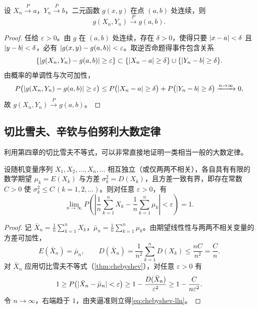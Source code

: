 \begin{proposition}[依概率收敛的连续映射性质]
\label{prop:conv-prob-continuous}
设 $X_n\xrightarrow{P} a$，$Y_n\xrightarrow{P} b$，二元函数 $g(x,y)$ 在点 $(a,b)$ 处连续，则
\[
  g(X_n,Y_n)\xrightarrow{P} g(a,b).
\]
\end{proposition}
\begin{proof}
任给 $\varepsilon>0$。由 $g$ 在 $(a,b)$ 处连续，存在 $\delta>0$，使得只要 $\lvert x-a\rvert<\delta$ 且 $\lvert y-b\rvert<\delta$，必有 $\lvert g(x,y)-g(a,b)\rvert<\varepsilon$。取逆否命题得事件包含关系
\[
  \{\lvert g(X_n,Y_n)-g(a,b)\rvert\ge\varepsilon\}
  \subset\{\lvert X_n-a\rvert\ge\delta\}\cup\{\lvert Y_n-b\rvert\ge\delta\}.
\]
由概率的单调性与次可加性，
\[
  P\bigl(\lvert g(X_n,Y_n)-g(a,b)\rvert\ge\varepsilon\bigr)
  \le P\bigl(\lvert X_n-a\rvert\ge\delta\bigr)+P\bigl(\lvert Y_n-b\rvert\ge\delta\bigr)
  \xrightarrow{n\to\infty} 0,
\]
故 $g(X_n,Y_n)\xrightarrow{P} g(a,b)$。
\end{proof}

\subsection{切比雪夫、辛钦与伯努利大数定律}

利用第四章的切比雪夫不等式，可以非常直接地证明一类相当一般的大数定律。

\begin{theorem}[切比雪夫大数定律]
\label{thm:chebyshev-lln}
设随机变量序列 $X_1,X_2,\ldots,X_n,\ldots$ 相互独立（或仅两两不相关），各自具有有限的数学期望 $\mu_k=E(X_k)$ 与方差 $\sigma_k^2=D(X_k)$，且方差一致有界，即存在常数 $C>0$ 使 $\sigma_k^2\le C\,(k=1,2,\ldots)$。则对任意 $\varepsilon>0$，有
\begin{equation}
  \lim_{n\to\infty}P\!\left(\left|\frac{1}{n}\sum_{k=1}^{n}X_k-\frac{1}{n}\sum_{k=1}^{n}\mu_k\right|<\varepsilon\right)=1.
  \label{eq:chebyshev-lln}
\end{equation}
\end{theorem}
\begin{proof}
记 $\bar{X}_n=\frac{1}{n}\sum_{k=1}^{n}X_k$，$\bar{\mu}_n=\frac{1}{n}\sum_{k=1}^{n}\mu_k$。由期望线性性与两两不相关变量的方差可加性，
\[
  E(\bar{X}_n)=\bar{\mu}_n,\qquad
  D(\bar{X}_n)=\frac{1}{n^2}\sum_{k=1}^{n}D(X_k)\le\frac{nC}{n^2}=\frac{C}{n}.
\]
对 $\bar{X}_n$ 应用切比雪夫不等式（\cref{thm:chebyshev}），对任意 $\varepsilon>0$ 有
\[
  1\ge P\bigl(\lvert\bar{X}_n-\bar{\mu}_n\rvert<\varepsilon\bigr)
  \ge 1-\frac{D(\bar{X}_n)}{\varepsilon^2}
  \ge 1-\frac{C}{n\varepsilon^2}.
\]
令 $n\to\infty$，右端趋于 $1$，由夹逼准则立得\eqref{eq:chebyshev-lln}。
\end{proof}

